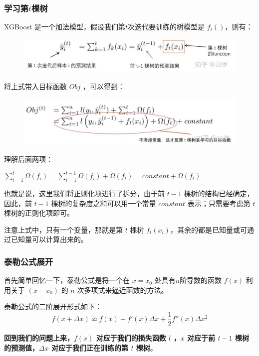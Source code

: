 \documentclass[12pt]{article}
\begin{document}
\subsubsection{学习第$t$棵树}
XGBoost 是一个加法模型，假设我们第$t$次迭代要训练的树模型是 $f_t()$，则有：
\begin{figure}[H]
    \centering
    \includegraphics[width=.8\textwidth]{fig/XGBoost_Eq_Train_Tth_Tree.png}
\end{figure}

将上式带入目标函数 $Obj$ ，可以得到：
\begin{figure}[H]
    \centering
    \includegraphics[width=.8\textwidth]{fig/XGBoost_Eq_Train_Tth_Tree_Objective.png}
\end{figure}

\begin{framed}
理解后面两项：

$\sum_{i=1}^t\Omega(f_i) = \sum_{i=1}^{t-1}\Omega(f_i) + \Omega(f_t) = constant + \Omega(f_t)$

也就是说，这里我们将正则化项进行了拆分，由于前 $t-1$ 棵树的结构已经确定，因此，前 $t-1$ 棵树的复杂度之和可以用一个常量 $constant$ 表示；只需要考虑第 $t$ 棵树的正则化项即可。
\end{framed}

注意上式中，只有一个变量，那就是第 $t$ 棵树 $f_t(x_i)$，其余的都是已知量或可通过已知量可以计算出来的。

\subsubsection{泰勒公式展开}
首先简单回忆一下，泰勒公式是将一个在 $x = x_0$ 处具有$n$阶导数的函数 $f(x)$ 利用关于 $(x-x_0)$ 的 $n$ 次多项式来逼近函数的方法。

泰勒公式的二阶展开形式如下：
$$
f(x + \Delta x) \backsimeq f(x) + f'(x)\Delta x + \frac{1}{2} f''(x) \Delta x^2
$$

\textbf{回到我们的问题上来，$f(x)$ 对应于我们的损失函数 $l$ ，$x$ 对应于前 $t-1$ 棵树的预测值，$\Delta x$ 对应于我们正在训练的第 $t$ 棵树}。
\end{document}
